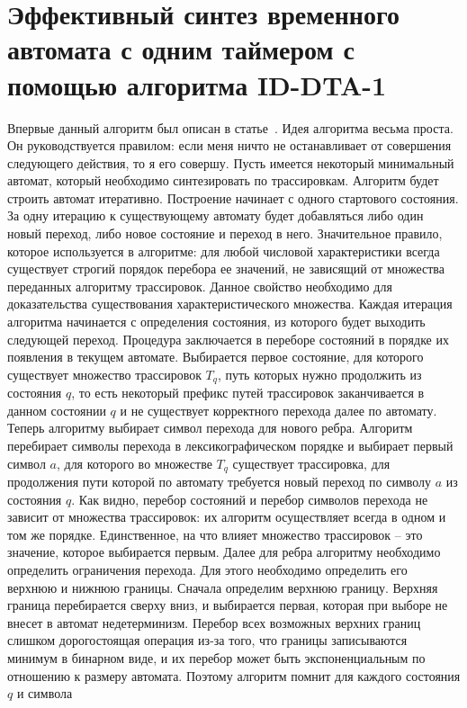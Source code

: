 \documentclass[times,specification,annotation]{itmo-student-thesis}
\begin{document}
\section{Эффективный синтез временного автомата с одним таймером с помощью алгоритма ID-DTA-1}

Впервые данный алгоритм был описан в статье~\cite{1-dta}. Идея алгоритма весьма проста.
Он руководствуется правилом: если меня ничто не останавливает от совершения следующего действия, то я его совершу. 
Пусть имеется некоторый минимальный автомат, который необходимо синтезировать по трассировкам. 
Алгоритм будет строить автомат итеративно. Построение начинает с одного стартового состояния. 
За одну итерацию к существующему автомату будет добавляться либо один новый переход, либо новое состояние и переход в него.
Значительное правило, которое используется в алгоритме: для любой числовой характеристики всегда существует строгий порядок перебора ее значений,
не зависящий от множества переданных алгоритму трассировок. Данное свойство необходимо для доказательства существования характеристического множества.
Каждая итерация алгоритма начинается с определения состояния, из которого будет выходить следующей переход. Процедура заключается в переборе состояний в порядке их появления в текущем автомате.
Выбирается первое состояние, для которого существует множество трассировок $T_q$, путь которых нужно продолжить из состояния $q$, то есть некоторый префикс путей трассировок
заканчивается в данном состоянии $q$ и не существует корректного перехода
далее по автомату. Теперь алгоритму выбирает символ перехода для нового ребра. Алгоритм перебирает символы перехода в лексикографическом порядке и выбирает первый символ $a$, для которого
во множестве $T_q$ существует трассировка, для продолжения пути которой по автомату требуется новый переход по символу $a$ из состояния $q$. Как видно, перебор состояний и перебор
символов перехода не зависит от множества трассировок: их алгоритм осуществляет всегда в одном и том же порядке. Единственное, на что влияет множество трассировок -- это значение, которое выбирается
первым. Далее для ребра алгоритму необходимо определить ограничения перехода. Для этого необходимо определить его верхнюю и нижнюю границы. Сначала определим верхнюю границу.
Верхняя граница перебирается сверху вниз, и выбирается первая, которая при выборе не внесет в автомат недетерминизм. Перебор всех возможных верхних границ слишком дорогостоящая операция из-за
того, что границы записываются минимум в бинарном виде, и их перебор может быть экспоненциальным по отношению к размеру автомата. Поэтому алгоритм помнит для каждого состояния $q$ и символа
\end{document}
